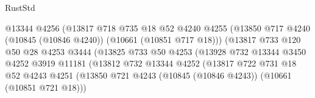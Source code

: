 \begin{lexlean}{RustStd}
\begin{coremodule}
                                        @13344
                                        @4256
                                        (@13817
                                          @718
                                          @735
                                          @18
                                          @52
                                          @4240
                                          @4255
                                          (@13850
                                            @717
                                            @4240
                                            (@10845 (@10846 @4240))
                                            (@10661 (@10851 @717 @18)))
                                          (@13817
                                            @733
                                            @120
                                            @50
                                            @28
                                            @4253
                                            @3444
                                            (@13825
                                              @733
                                              @50
                                              @4253
                                              (@13928
                                                @732
                                                @13344
                                                @3450
                                                @4252
                                                @3919
                                                @11181
                                                (@13812
                                                  @732
                                                  @13344
                                                  @4252
                                                  (@13817
                                                    @722
                                                    @731
                                                    @18
                                                    @52
                                                    @4243
                                                    @4251
                                                    (@13850
                                                      @721
                                                      @4243
                                                      (@10845 (@10846 @4243))
                                                      (@10661 (@10851 @721 @18)))

\end{coremodule}
\end{lexlean}
